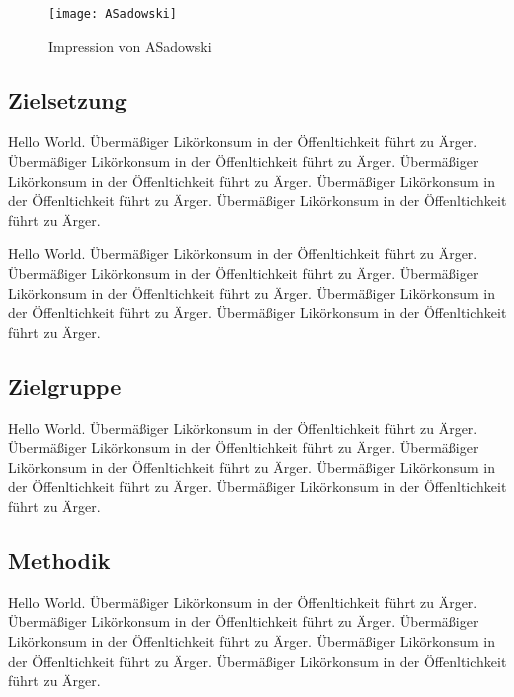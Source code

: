 \begin{figure}[htb] %
\begin{center}
\texttt{[image: ASadowski]} %
\end{center}

\caption{Impression von ASadowski}
\label{fig:bald}
\end{figure}

\subsection{Zielsetzung}
\label{sec:ziel} %
Hello World.
Übermäßiger Likörkonsum in der Öffenltichkeit führt zu Ärger.
Übermäßiger Likörkonsum in der Öffenltichkeit führt zu Ärger.
Übermäßiger Likörkonsum in der Öffenltichkeit führt zu Ärger.
Übermäßiger Likörkonsum in der Öffenltichkeit führt zu Ärger.
Übermäßiger Likörkonsum in der Öffenltichkeit führt zu Ärger.

Hello World.
Übermäßiger Likörkonsum in der Öffenltichkeit führt zu Ärger.
Übermäßiger Likörkonsum in der Öffenltichkeit führt zu Ärger.
Übermäßiger Likörkonsum in der Öffenltichkeit führt zu Ärger.
Übermäßiger Likörkonsum in der Öffenltichkeit führt zu Ärger.
Übermäßiger Likörkonsum in der Öffenltichkeit führt zu Ärger.


\subsection{Zielgruppe}
Hello World.
Übermäßiger Likörkonsum in der Öffenltichkeit führt zu Ärger.
Übermäßiger Likörkonsum in der Öffenltichkeit führt zu Ärger.
Übermäßiger Likörkonsum in der Öffenltichkeit führt zu Ärger.
Übermäßiger Likörkonsum in der Öffenltichkeit führt zu Ärger.
Übermäßiger Likörkonsum in der Öffenltichkeit führt zu Ärger.

\subsection{Methodik}
Hello World.
Übermäßiger Likörkonsum in der Öffenltichkeit führt zu Ärger.
Übermäßiger Likörkonsum in der Öffenltichkeit führt zu Ärger.
Übermäßiger Likörkonsum in der Öffenltichkeit führt zu Ärger.
Übermäßiger Likörkonsum in der Öffenltichkeit führt zu Ärger.
Übermäßiger Likörkonsum in der Öffenltichkeit führt zu Ärger.
